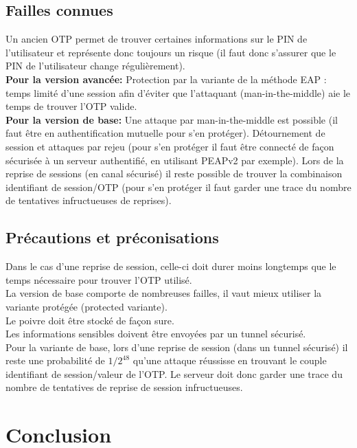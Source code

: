 \documentclass{../res/univ-projet}
\begin{document}
\subsection{Failles connues}
    Un ancien OTP permet de trouver certaines informations sur le PIN de l'utilisateur et représente donc toujours un risque (il faut donc s'assurer que le PIN de l'utilisateur change régulièrement).\\

   \textbf{ Pour la version avancée:}
    Protection par la variante de la méthode EAP : temps limité d'une session afin d'éviter que l'attaquant (man-in-the-middle) aie le temps de trouver l'OTP valide.\\
    
    \textbf{Pour la version de base:}
    Une attaque par man-in-the-middle est possible (il faut être en authentification mutuelle pour s'en protéger).
    Détournement de session et attaques par rejeu (pour s'en protéger il faut être connecté de façon sécurisée à un serveur authentifié, en utilisant PEAPv2 par exemple).
    Lors de la reprise de sessions (en canal sécurisé) il reste possible de trouver la combinaison identifiant de session/OTP (pour s'en protéger il faut garder une trace du nombre de tentatives infructueuses de reprises).

\subsection{Précautions et préconisations}
    Dans le cas d'une reprise de session, celle-ci doit durer moins longtemps que le temps nécessaire pour trouver l'OTP utilisé.\\
    La version de base comporte de nombreuses failles, il vaut mieux utiliser la variante protégée (protected variante).\\
    Le poivre doit être stocké de façon sure.\\
    Les informations sensibles doivent être envoyées par un tunnel sécurisé.\\
    
    Pour la variante de base, lors d'une reprise de session (dans un tunnel sécurisé) il reste une probabilité de $1/2^48$ qu'une attaque réussisse en trouvant le couple identifiant de session/valeur de l'OTP. Le serveur doit donc garder une trace du nombre de tentatives de reprise de session infructueuses.\\

\section{Conclusion}
\end{document}
